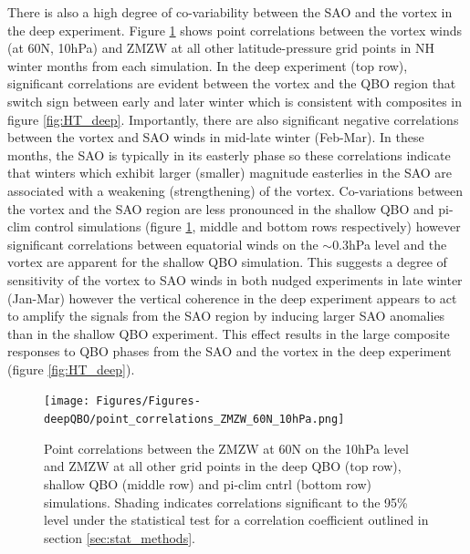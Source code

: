 There is also a high degree of co-variability between the SAO and the vortex in the deep experiment. Figure \ref{fig:point_cors} shows point correlations between the vortex winds (at 60N, 10hPa) and ZMZW at all other latitude-pressure grid points in NH winter months from each simulation. In the deep experiment (top row), significant correlations are evident between the vortex and the QBO region that switch sign between early and later winter which is consistent with composites in figure \ref{fig:HT_deep}. Importantly, there are also significant negative correlations between the vortex and SAO winds in mid-late winter (Feb-Mar). In these months, the SAO is typically in its easterly phase so these correlations indicate that winters which exhibit larger (smaller) magnitude easterlies in the SAO are associated with a weakening (strengthening) of the vortex. Co-variations between the vortex and the SAO region are less pronounced in the shallow QBO and pi-clim control simulations (figure \ref{fig:point_cors}, middle and bottom rows respectively) however significant correlations between equatorial winds on the $\sim$0.3hPa level and the vortex are apparent for the shallow QBO simulation. This suggests a degree of sensitivity of the vortex to SAO winds in both nudged experiments in late winter (Jan-Mar) however the vertical coherence in the deep experiment appears to act to amplify the signals from the SAO region by inducing larger SAO anomalies than in the shallow QBO experiment. This effect results in the large composite responses to QBO phases from the SAO and the vortex in the deep experiment (figure \ref{fig:HT_deep}).

\begin{figure}[h!]
\begin{center}
\noindent\texttt{[image: Figures/Figures-deepQBO/point\_correlations\_ZMZW\_60N\_10hPa.png]}
\caption[Point correlations between vortex ZMZWs and winds at other points in QBO experiments]{Point correlations between the ZMZW at 60N on the 10hPa level and ZMZW at all other grid points in the deep QBO (top row), shallow QBO (middle row) and pi-clim cntrl (bottom row) simulations. Shading indicates correlations significant to the 95\% level under the statistical test for a correlation coefficient outlined in section \ref{sec:stat_methods}.}
\label{fig:point_cors}
\end{center}
\end{figure}


